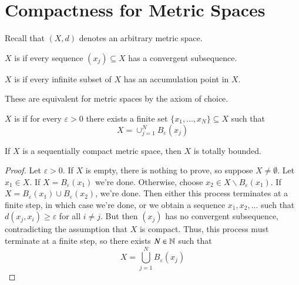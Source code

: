 \section{Compactness for Metric Spaces}

Recall that $(X,d)$ denotes an arbitrary metric space.

\begin{defn}
    $X$ is  if every sequence $(x_j) \subseteq X$ has a convergent subsequence.
\end{defn}

\begin{defn}
    $X$ is  if every infinite subset of $X$ has an accumulation point in $X$.
\end{defn}

These are equivalent for metric spaces by the axiom of choice.

\begin{defn}
    $X$ is  if for every $\varepsilon > 0$ there exists a finite set $\{x_1,...,x_N\} \subseteq X$ such that \begin{equation*}
        X = \cup_{j=1}^NB_{\varepsilon}(x_j)
    \end{equation*}
\end{defn}

\begin{prop}\label{prop:2.3.1}
    If $X$ is a sequentially compact metric space, then $X$ is totally bounded.
\end{prop}
\begin{proof}
    Let $\varepsilon > 0$. If $X$ is empty, there is nothing to prove, so suppose $X \neq \emptyset$. Let $x_1 \in X$. If $X = B_{\varepsilon}(x_1)$ we're done. Otherwise, choose $x_2 \in X\backslash B_{\varepsilon}(x_1)$. If $X = B_{\varepsilon}(x_1)\cup B_{\varepsilon}(x_2)$, we're done. Then either this process terminates at a finite step, in which case we're done, or we obtain a sequence $x_1,x_2,...$ such that $d(x_j,x_i) \geq \varepsilon$ for all $i \neq j$. But then $(x_j)$ has no convergent subsequence, contradicting the assumption that $X$ is compact. Thus, this process must terminate at a finite step, so there exists $N \in \mathbb N$ such that $$X  = \bigcup_{j=1}^NB_{\varepsilon}(x_j)$$
\end{proof}

